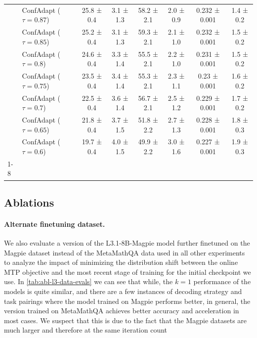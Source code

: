 \documentclass{article}
\theoremstyle{plain}
\theoremstyle{definition}
\theoremstyle{remark}
\begin{document}
\begin{table}[h!]
\begin{tabular}{llcccccc}
 & ConfAdapt ($\tau=0.87$) & 25.8 ± 0.4 & 3.1 ± 1.3 & 58.2 ± 2.1 & 2.0 ± 0.9 & 0.232 ± 0.001 & 1.4 ± 0.2 \\
 & ConfAdapt ($\tau=0.85$) & 25.2 ± 0.4 & 3.1 ± 1.3 & 59.3 ± 2.1 & 2.1 ± 1.0 & 0.232 ± 0.001 & 1.5 ± 0.2 \\
 & ConfAdapt ($\tau=0.8$) & 24.6 ± 0.4 & 3.3 ± 1.4 & 55.5 ± 2.1 & 2.2 ± 1.0 & 0.231 ± 0.001 & 1.5 ± 0.2 \\
 & ConfAdapt ($\tau=0.75$) & 23.5 ± 0.4 & 3.4 ± 1.4 & 55.3 ± 2.1 & 2.3 ± 1.1 & 0.23 ± 0.001 & 1.6 ± 0.2 \\
 & ConfAdapt ($\tau=0.7$) & 22.5 ± 0.4 & 3.6 ± 1.4 & 56.7 ± 2.1 & 2.5 ± 1.2 & 0.229 ± 0.001 & 1.7 ± 0.2 \\
 & ConfAdapt ($\tau=0.65$) & 21.8 ± 0.4 & 3.7 ± 1.5 & 51.8 ± 2.2 & 2.7 ± 1.3 & 0.228 ± 0.001 & 1.8 ± 0.3 \\
 & ConfAdapt ($\tau=0.6$) & 19.7 ± 0.4 & 4.0 ± 1.5 & 49.9 ± 2.2 & 3.0 ± 1.6 & 0.227 ± 0.001 & 1.9 ± 0.3 \\
\cline{1-8}
\bottomrule
\end{tabular}
\end{table}



\clearpage

\subsection{Ablations}\label{app:ablations}

\paragraph{Alternate finetuning dataset.}
We also evaluate a version of the L3.1-8B-Magpie model further finetuned on the Magpie dataset instead of the MetaMathQA data used in all other experiments to analyze the impact of minimizing the distribution shift between the online MTP objective and the most recent stage of training for the initial checkpoint we use. In \cref{tab:abl-l3-data-evals} we can see that while, the $k=1$ performance of the models is quite similar, and there are a few instances of decoding strategy and task pairings where the model trained on Magpie performs better, in general, the version trained on MetaMathQA achieves better accuracy and acceleration in most cases. We suspect that this is due to the fact that the Magpie datasets are much larger and therefore at the same iteration count
\end{document}
